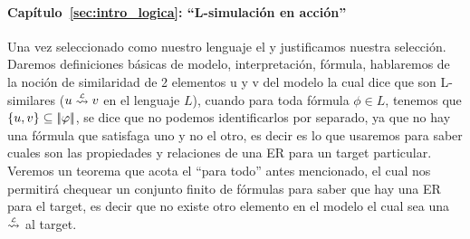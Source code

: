 \paragraph{Cap\'itulo~\ref{sec:intro_logica}: ``L-simulaci\'on en acci\'on''} Una vez seleccionado como nuestro lenguaje el \EL y justificamos nuestra selecci\'on. Daremos definiciones b\'asicas de modelo, interpretaci\'on, f\'ormula, hablaremos de la noci\'on de similaridad de 2 elementos u y v del modelo la cual dice que son L-similares ($u \simil{\+L} v$ en el lenguaje $L$), cuando para toda f\'ormula $\phi \in L$, tenemos que $\{u,v\} \subseteq |\!|\varphi|\!|$, se dice que no podemos identificarlos por separado, ya que no hay una f\'ormula que satisfaga uno y no el otro, es decir es lo que usaremos para saber cuales son las propiedades y relaciones de una ER para un target particular. Veremos un teorema que acota el ``para todo'' antes mencionado, el cual nos permitir\'a chequear un conjunto finito de f\'ormulas para saber que hay una ER para el target, es decir que no existe otro elemento en el modelo el cual sea una $\simil{\+L}$ al target. 
%


